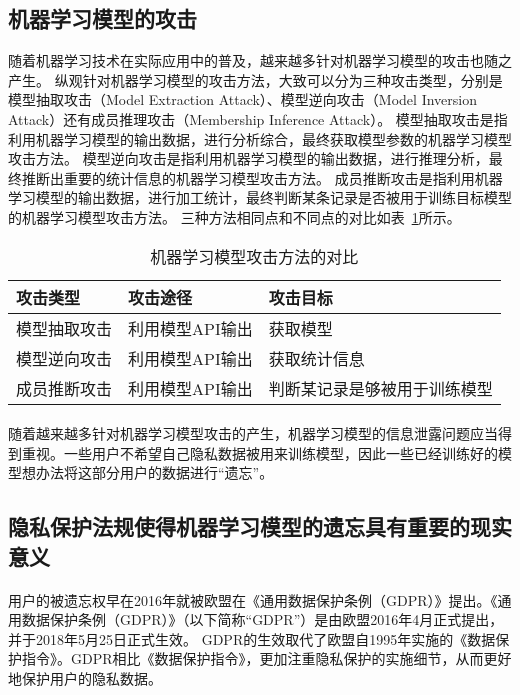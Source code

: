 \subsection{机器学习模型的攻击}
随着机器学习技术在实际应用中的普及，越来越多针对机器学习模型的攻击也随之产生。
纵观针对机器学习模型的攻击方法，大致可以分为三种攻击类型，分别是模型抽取攻击（Model Extraction Attack）、模型逆向攻击（Model Inversion Attack）还有成员推理攻击（Membership Inference Attack）。
模型抽取攻击是指利用机器学习模型的输出数据，进行分析综合，最终获取模型参数的机器学习模型攻击方法。
模型逆向攻击是指利用机器学习模型的输出数据，进行推理分析，最终推断出重要的统计信息的机器学习模型攻击方法。
成员推断攻击是指利用机器学习模型的输出数据，进行加工统计，最终判断某条记录是否被用于训练目标模型的机器学习模型攻击方法。
三种方法相同点和不同点的对比如表~\ref{tab:model-attack-difference}所示。
\begin{table}
    \centering
    \caption{机器学习模型攻击方法的对比}
    \begin{tabular}{lll}
      \toprule
      攻击类型  & 攻击途径 & 攻击目标  \\
      \midrule
      模型抽取攻击   & 利用模型API输出 & 获取模型 \\
      模型逆向攻击   & 利用模型API输出 & 获取统计信息                    \\
      成员推断攻击 & 利用模型API输出  & 判断某记录是够被用于训练模型  \\
      \bottomrule
    \end{tabular}
    \label{tab:model-attack-difference}
\end{table}
\paragraph{}随着越来越多针对机器学习模型攻击的产生，机器学习模型的信息泄露问题应当得到重视。一些用户不希望自己隐私数据被用来训练模型，因此一些已经训练好的模型想办法将这部分用户的数据进行“遗忘”。
\subsection{隐私保护法规使得机器学习模型的遗忘具有重要的现实意义}
\paragraph{}用户的被遗忘权早在2016年就被欧盟在《通用数据保护条例（GDPR）》提出。《通用数据保护条例（GDPR）》（以下简称“GDPR”）是由欧盟2016年4月正式提出，并于2018年5月25日正式生效。
GDPR的生效取代了欧盟自1995年实施的《数据保护指令》。GDPR相比《数据保护指令》，更加注重隐私保护的实施细节，从而更好地保护用户的隐私数据。
